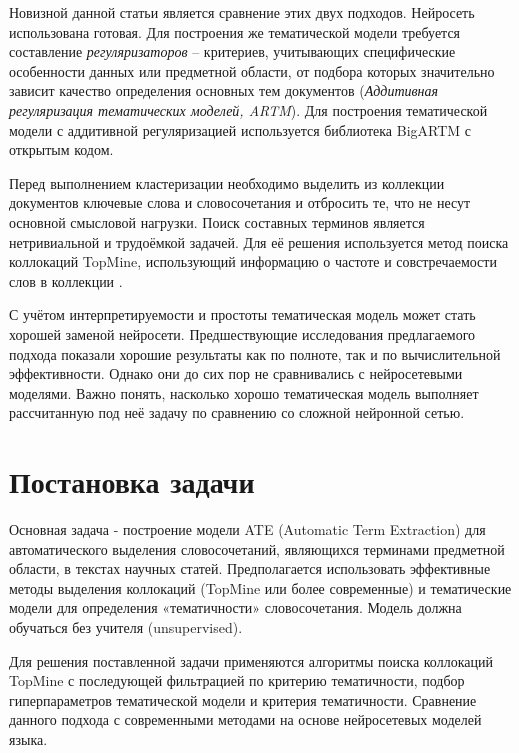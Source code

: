 \documentclass[a4paper, 12pt]{article}
\begin{document}
        Новизной данной статьи является сравнение этих двух подходов. Нейросеть использована готовая. 
        Для построения же тематической модели требуется составление \textit{регуляризаторов} -- критериев, учитывающих специфические особенности данных или предметной области, от подбора которых значительно зависит качество определения основных тем документов (\textit{Аддитивная регуляризация тематических моделей, ARTM}). Для построения тематической модели с аддитивной регуляризацией используется библиотека BigARTM \citep{Vorontsov2015} с открытым кодом.

        Перед выполнением кластеризации необходимо выделить из коллекции документов ключевые слова и словосочетания и отбросить те, что не несут основной смысловой нагрузки. Поиск составных терминов является нетривиальной и трудоёмкой задачей. Для её решения используется метод поиска коллокаций TopMine, использующий информацию о частоте и совстречаемости слов в коллекции \citep{shatalov2019}.


        С учётом интерпретируемости и простоты тематическая модель может стать хорошей заменой нейросети. Предшествующие исследования предлагаемого подхода показали хорошие результаты как по полноте, так и по вычислительной эффективности. Однако они до сих пор не сравнивались с нейросетевыми моделями. Важно понять, насколько хорошо тематическая модель выполняет рассчитанную под неё задачу по сравнению со сложной нейронной сетью.

\section{Постановка задачи}

        Основная задача - построение модели ATE (Automatic Term Extraction) для автоматического выделения словосочетаний, являющихся терминами предметной области, в текстах научных статей. Предполагается использовать эффективные методы выделения коллокаций (TopMine или более современные) и тематические модели для определения «тематичности» словосочетания. Модель должна обучаться без учителя (unsupervised).

        Для решения поставленной задачи применяются алгоритмы поиска коллокаций TopMine с последующей фильтрацией по критерию тематичности, подбор гиперпараметров тематической модели и критерия тематичности. Сравнение данного подхода с современными методами на основе нейросетевых моделей языка. 
\end{document}
